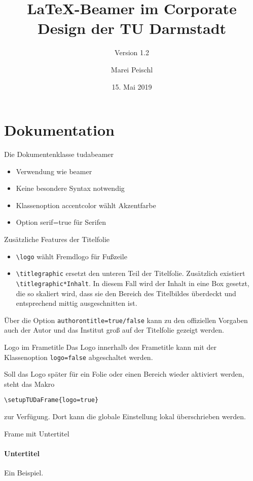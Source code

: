 \documentclass[
	ngerman,%
	aspectratio=169,%
	accentcolor=2d,%
	logo=false,%
	colorframetitle=true,%
	design=2008,  %
	]{tudabeamer}
\title{LaTeX-Beamer im Corporate Design der TU Darmstadt}
\subtitle{Version 1.2}
\author[M. Peischl]{Marei Peischl}
\institute{pei\TeX}
\date{15. Mai 2019}
\let\code\texttt
\begin{document}
\maketitle

\section{Dokumentation}
\begin{frame}{Die Dokumentenklasse tudabeamer}
\begin{itemize}
	\item Verwendung wie beamer
	\item Keine besondere Syntax notwendig
	\item Klassenoption accentcolor wählt Akzentfarbe
	\item Option serif=true für Serifen	
\end{itemize}
\end{frame}

\begin{frame}{Zusätzliche Features der Titelfolie}
\begin{itemize}
	\item \code{\textbackslash{}logo} wählt Fremdlogo für Fußzeile
	\item \code{\textbackslash{}titlegraphic} ersetzt den unteren Teil der Titelfolie. Zusätzlich existiert \code{\textbackslash{}titlegraphic*{Inhalt}}.
	In diesem Fall wird der Inhalt in eine Box gesetzt, die so skaliert wird, dass sie den Bereich des Titelbildes überdeckt und entsprechend mittig ausgeschnitten ist.
\end{itemize}
	Über die Option \code{authorontitle=true/false} kann zu den offiziellen Vorgaben auch der Autor und das Institut groß auf der Titelfolie gezeigt werden.
\end{frame}

\begin{frame}[fragile]{Logo im Frametitle}
Das Logo innerhalb des Frametitle kann mit der Klassenoption \code{logo=false} abgeschaltet werden.

Soll das Logo später für ein Folie oder einen Bereich wieder aktiviert werden, steht das Makro
\begin{verbatim}
\setupTUDaFrame{logo=true}
\end{verbatim}
zur Verfügung. Dort kann die globale Einstellung lokal überschrieben werden.
\end{frame}

\begin{frame}{Frame mit Untertitel}
\framesubtitle{Untertitel}
Ein Beispiel.
\end{frame}
\end{document}
